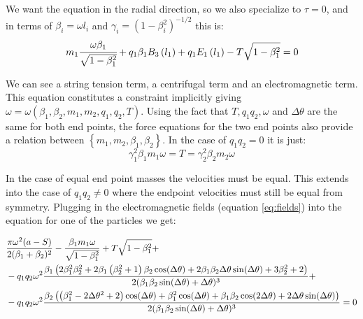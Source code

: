 \documentclass[11pt,a4paper]{article}
\begin{document}
We want the equation in the radial direction, so we also specialize to $\tau=0$, and in terms of $\beta_{i}=\omega l_{i}$ and $\gamma_{i}=\left(1-\beta_{i}^{2}\right)^{-1/2}$ this is:
\begin{equation}
m_{1}\cfrac{\omega\beta_{1}}{\sqrt{1-\beta_{1}^{2}}}+q_{1}\beta_{1}B_{3}\left(l_{1}\right)+q_{1}E_{1}\left(l_{1}\right)-T\sqrt{1-\beta_{1}^{2}}=0
\end{equation}

We can see a string tension term, a centrifugal term and an electromagnetic term. This equation constitutes a constraint implicitly giving $\omega=\omega\left(\beta_{1},\beta_{2},m_{1},m_{2},q_{1},q_{2},T\right)$. Using the fact that $T,q_1q_2,\omega$ and $\Delta\theta$ are the same for both end points, the force equations for the two end points also provide a relation between $\left\{ m_{1},m_{2},\beta_{1},\beta_{2}\right\}$. In the case of $q_1q_2=0$ it is just:
\begin{equation}
\label{eq:massrelation}
\gamma_{1}^{2}\beta_{1}m_{1}\omega=T=\gamma_{2}^{2}\beta_{2}m_{2}\omega
\end{equation}


In the case of equal end point masses the velocities must be equal. This extends into the case of $q_1q_2\neq0$ where the endpoint velocities must still be equal from symmetry. Plugging in the electromagnetic fields (equation \ref{eq:fields}) into the equation for one of the particles we get:

\begin{align}
\label{eq:endpoint}
&\frac{\pi  \omega ^2 (a-S)}{2 (\beta_1+\beta_2)^2}-\frac{\beta_1 m_1 \omega }{\sqrt{1-\beta_1^2}}+T\sqrt{1-\beta_1^2}+\\
&-q_1 q_2 \omega ^2 \frac{\beta_1 \left(2 \beta_1^2 \beta_2^2+2 \beta_1 \left(\beta_2^2+1\right) \beta_2 \cos (\Delta \theta )+2 \beta_1 \beta_2 \Delta \theta  \sin (\Delta \theta )+3 \beta_2^2+2\right)}{2 (\beta_1 \beta_2 \sin (\Delta \theta )+\Delta \theta )^3}+\notag\\
&-q_1 q_2 \omega ^2\frac{\beta_2 \left(\left(\beta_1^2-2 \Delta \theta ^2+2\right) \cos (\Delta \theta )+\beta_1^2 \cos (\Delta \theta )+\beta_1 \beta_2 \cos (2 \Delta \theta )+2 \Delta \theta  \sin (\Delta \theta )\right)}{2 (\beta_1 \beta_2 \sin (\Delta \theta )+\Delta \theta )^3}=0\notag
\end{align}
\end{document}
